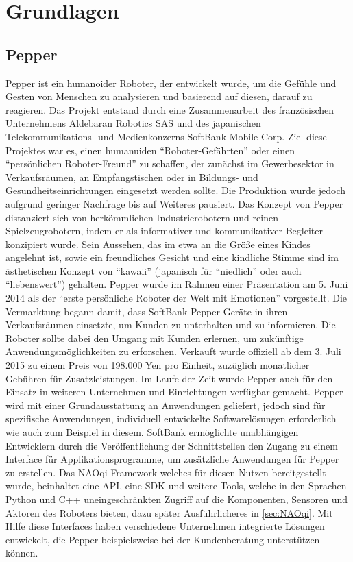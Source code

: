 \chapter{Grundlagen}
\label{chap:Grundlagen}

\section{Pepper}
\label{sec:Pepper}
Pepper ist ein humanoider Roboter, der entwickelt wurde, um die Gefühle und Gesten von Menschen zu analysieren und basierend auf diesen, darauf zu reagieren. Das Projekt entstand durch eine Zusammenarbeit des französischen Unternehmens Aldebaran Robotics \ac{SAS} und des japanischen Telekommunikations- und Medienkonzerns SoftBank Mobile Corp. Ziel diese Projektes war es, einen humanuiden ``Roboter-Gefährten'' oder einen ``persönlichen Roboter-Freund'' zu schaffen, der zunächst im Gewerbesektor in Verkaufsräumen, an Empfangstischen oder in Bildungs- und Gesundheitseinrichtungen eingesetzt werden sollte. Die Produktion wurde jedoch aufgrund geringer Nachfrage bis auf Weiteres pausiert.
Das Konzept von Pepper distanziert sich von herkömmlichen Industrierobotern und reinen Spielzeugrobotern, indem er als informativer und kommunikativer Begleiter konzipiert wurde. Sein Aussehen, das im etwa an die Größe eines Kindes angelehnt ist, sowie ein freundliches Gesicht und eine kindliche Stimme sind im ästhetischen Konzept von ``kawaii'' (japanisch für ``niedlich'' oder auch ``liebenswert'') gehalten.
Pepper wurde im Rahmen einer Präsentation am 5. Juni 2014 als der ``erste persönliche Roboter der Welt mit Emotionen'' vorgestellt. Die Vermarktung begann damit, dass SoftBank Pepper-Geräte in ihren Verkaufsräumen einsetzte, um Kunden zu unterhalten und zu informieren. Die Roboter sollte dabei den Umgang mit Kunden erlernen, um zukünftige Anwendungsmöglichkeiten zu erforschen. Verkauft wurde offiziell ab dem 3. Juli 2015 zu einem Preis von 198.000 Yen pro Einheit, zuzüglich monatlicher Gebühren für Zusatzleistungen. Im Laufe der Zeit wurde Pepper auch für den Einsatz in weiteren Unternehmen und Einrichtungen verfügbar gemacht.
Pepper wird mit einer Grundausstattung an Anwendungen geliefert, jedoch sind für spezifische Anwendungen, individuell entwickelte Softwarelösungen erforderlich wie auch zum Beispiel in diesem. SoftBank ermöglichte unabhängigen Entwicklern durch die Veröffentlichung der Schnittstellen den Zugang zu einem Interface für Applikationsprogramme, um zusätzliche Anwendungen für Pepper zu erstellen. Das NAOqi-Framework welches für diesen Nutzen bereitgestellt wurde, beinhaltet eine \ac{API}, eine \ac{SDK} und weitere Tools, welche in den Sprachen Python und C++ uneingeschränkten Zugriff auf die Komponenten, Sensoren und Aktoren des Roboters bieten, dazu später Ausführlicheres in \autoref{sec:NAOqi}. Mit Hilfe diese Interfaces haben verschiedene Unternehmen integrierte Lösungen entwickelt, die Pepper beispielsweise bei der Kundenberatung unterstützen können.
